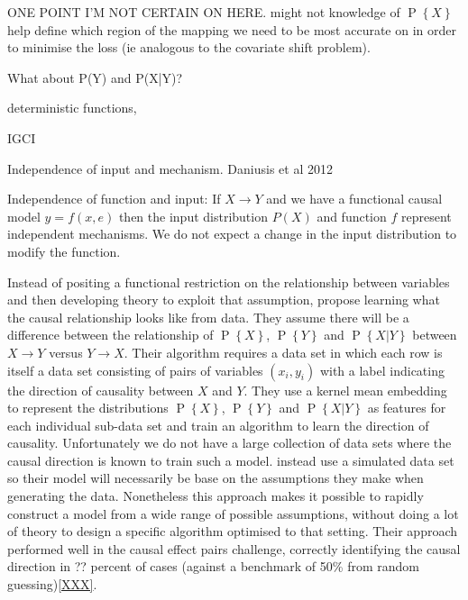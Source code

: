 \documentclass[11pt,a4paper,oneside]{book}
\renewcommand{\P}[1]{\operatorname{P}\left\{#1\right\}}
\theoremstyle{plain}
\theoremstyle{definition}
\begin{document}
ONE POINT I'M NOT CERTAIN ON HERE. might not knowledge of $\P{X}$ help define which region of the mapping we need to be most accurate on in order to minimise the loss (ie analogous to the covariate shift problem). 

What about P(Y) and P(X|Y)?


deterministic functions,

IGCI \cite{Janzing2012a}

Independence of input and mechanism. Daniusis et al 2012

Independence of function and input: If $X \rightarrow Y$ and we have a functional causal model $y = f(x,e)$ then the input
distribution $P(X)$ and function $f$ represent independent mechanisms. We do not expect a change in the input distribution to modify the function. 


Instead of positing a functional restriction on the relationship between variables and then developing theory to exploit that assumption, \citep{LopezPaz2014} propose learning what the causal relationship looks like from data. They assume there will be a difference between the relationship of $\P{X}$, $\P{Y}$ and $\P{X|Y}$ between $X \rightarrow Y$ versus $Y \rightarrow X$. Their algorithm requires a data set in which each row is itself a data set consisting of pairs of variables $(x_i,y_i)$ with a label indicating the direction of causality between $X$ and $Y$. They use a kernel mean embedding to represent the distributions $\P{X}$, $\P{Y}$ and $\P{X|Y}$ as features for each individual sub-data set and train an algorithm to learn the direction of causality. Unfortunately we do not have a large collection of data sets where the causal direction is known to train such a model. \citep{LopezPaz2014} instead use a simulated data set so their model will necessarily be base on the assumptions they make when generating the data. Nonetheless this approach makes it possible to rapidly construct a model from a wide range of possible assumptions, without doing a lot of theory to design a specific algorithm optimised to that setting. Their approach performed well in the causal effect pairs challenge, correctly identifying the causal direction in ?? percent of cases (against a benchmark of 50\% from random guessing)\ref{XXX}.
\end{document}
